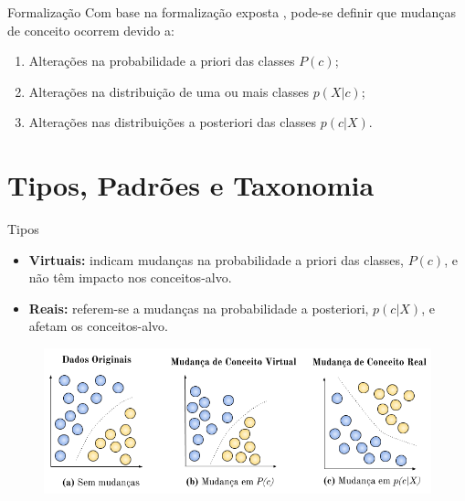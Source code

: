 \documentclass[10pt]{beamer}
\begin{document}
\begin{frame}{Formalização}
Com base na formalização exposta \cite{Zliobaite:2010}, pode-se definir que mudanças de conceito ocorrem devido a:

\begin{enumerate}
    \item Alterações na probabilidade a priori das classes $P(c)$;
    \item Alterações na distribuição de uma ou mais classes $p(X|c)$;
    \item Alterações nas distribuições a posteriori das classes $p(c|X)$.
\end{enumerate}
\end{frame}

\section{Tipos, Padrões e Taxonomia}

\begin{frame}{Tipos}
    \begin{itemize}
        \item \textbf{Virtuais:} indicam mudanças na probabilidade a priori das classes, $P(c)$, e não têm impacto nos conceitos-alvo.
        \item \textbf{Reais:} referem-se a mudanças na probabilidade a posteriori, $p(c|X)$, e afetam os conceitos-alvo.
    \end{itemize} 

    \begin{figure}[H]
    \begin{center}
        \includegraphics[scale=0.5]{imagens/concept_drift.png}
    \end{center}
    \end{figure}
\end{frame}
 
\end{document}
